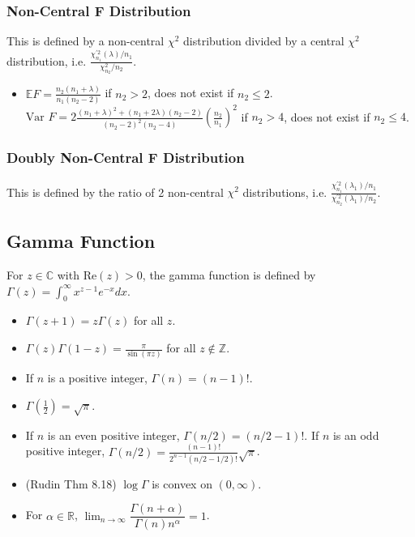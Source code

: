 \documentclass[twoside]{article}
\newcommand{\dis}{\displaystyle}
\newcommand\bbC{\mathbb{C}}
\newcommand\bbE{\mathbb{E}}
\newcommand\bbR{\mathbb{R}}
\newcommand\bbZ{\mathbb{Z}}
\newcommand\lmb{\lambda}
\newcommand\goesto{\rightarrow}
\newcommand\var{\text{Var }}
\begin{document}
\subsubsection{Non-Central F Distribution}
This is defined by a non-central $\chi^2$ distribution divided by a central $\chi^2$ distribution, i.e. $\displaystyle\frac{\chi^{\prime 2}_{n_1} (\lmb) / n_1}{\chi_{n_2}^2 / n_2}$.

\begin{itemize}
\item $\bbE F = \displaystyle\frac{n_2(n_1 + \lmb)}{n_1(n_2 - 2)}$ if $n_2 > 2$, does not exist if $n_2 \leq 2$. $\var F = 2\displaystyle\frac{(n_1 + \lmb)^2 + (n_1 + 2\lmb)(n_2 - 2)}{(n_2 - 2)^2(n_2 - 4)} \left( \frac{n_2}{n_1}\right)^2$ if $n_2 > 4$, does not exist if $n_2 \leq 4$.
\end{itemize}

\subsubsection{Doubly Non-Central F Distribution}
This is defined by the ratio of 2 non-central $\chi^2$ distributions, i.e. $\displaystyle\frac{\chi^{\prime 2}_{n_1} (\lmb_1) / n_1}{\chi^{\prime 2}_{n_2} (\lmb_1) / n_2}$.


\subsection{Gamma Function}
For $z \in \bbC$ with $\text{Re}(z) > 0$, the gamma function is defined by $\Gamma(z) = \displaystyle\int_0^\infty x^{z-1}e^{-x} dx$.

\begin{itemize}
\item $\Gamma(z+1) = z \Gamma (z)$ for all $z$.

\item $\Gamma(z) \Gamma (1 - z) = \displaystyle\frac{\pi}{\sin (\pi z)}$ for all $z \notin \bbZ$.

\item If $n$ is a positive integer, $\Gamma (n) = (n-1)!$.

\item $\Gamma \left( \frac{1}{2} \right) = \sqrt{\pi}$.

\item If $n$ is an even positive integer, $\Gamma(n/2) = (n/2 - 1)!$. If $n$ is an odd positive integer, $\Gamma (n/2) = \displaystyle\frac{(n-1)!}{2^{n-1}(n/2 - 1/2)!} \sqrt{\pi}$.

\item (Rudin Thm 8.18) $\log \Gamma$ is convex on $(0 , \infty)$.

\item For $\alpha \in \bbR$, $\dis\lim_{n \goesto \infty} \dfrac{\Gamma(n+\alpha)}{\Gamma(n)n^\alpha} = 1$.
\end{itemize}
\end{document}
